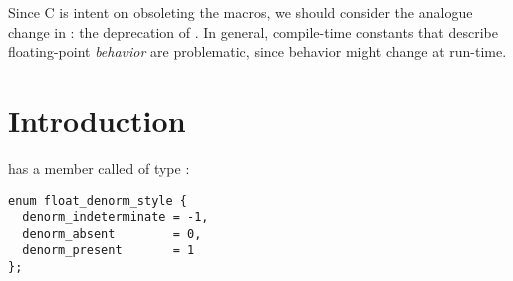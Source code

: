 \newcommand\wgTitle{Deprecate \code{numeric\_limits::has\_denorm}}
\newcommand\wgName{Matthias Kretz <m.kretz@gsi.de>}
\newcommand\wgDocumentNumber{D2614R0}
\newcommand\wgGroup{SG6, LEWG}
\newcommand\wgTarget{\CC{}26}
\newcommand\wgAcknowledgements{
Thanks to WG14 and specifically Fred Tydeman for their work on \code{*\_HAS\_SUBNORM} and 
presenting in SG6. Thanks to Dietmar Kühl, Fred Tydeman, Jens Maurer, John McFarlane, and 
Mark Hoemmen for the discussion in SG6 that motivated this paper. Much of this paper is 
copied (and adjusted) from the corresponding WG14 papers authored by Fred Tydeman.
}

\usepackage{mymacros}
\usepackage{wg21}
\usepackage{changelog}
\usepackage{underscore}



\newcommand\wglink[1]{\href{https://wg21.link/#1}{#1}}


\begin{wgTitlepage}
  Since C is intent on obsoleting the  macros, we should consider the 
  analogue change in \CC{}: the deprecation of . In 
  general, compile-time constants that describe floating-point \emph{behavior} are 
  problematic, since behavior might change at run-time.
\end{wgTitlepage}

\pagestyle{scrheadings}

%

%

\section{Introduction}

 has a member called  of type 
:
\medskip\begin{lstlisting}[style=Vc]
enum float_denorm_style {
  denorm_indeterminate = -1,
  denorm_absent        = 0,
  denorm_present       = 1
};
\end{lstlisting}

